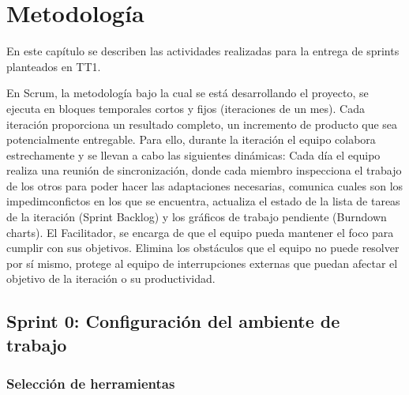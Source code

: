 \chapter{Metodología} \label{cap:siete}

En este capítulo se describen las actividades realizadas para la entrega de sprints planteados en TT1.

En Scrum, la metodología bajo la cual se está desarrollando el proyecto, se ejecuta en bloques temporales cortos y fijos (iteraciones de un mes). Cada iteración proporciona un resultado completo, un incremento de producto que sea potencialmente entregable. Para ello, durante la iteración el equipo colabora estrechamente y se llevan a cabo las siguientes dinámicas:
\bigskip
Cada día el equipo realiza una reunión de sincronización, donde cada miembro inspecciona el trabajo de los otros para poder hacer las adaptaciones necesarias, comunica cuales son los impedimconfictos en los que se encuentra, actualiza el estado de la lista de tareas de la iteración (Sprint Backlog) y los gráficos de trabajo pendiente (Burndown charts).
\bigskip
El Facilitador, se encarga de que el equipo pueda mantener el foco para cumplir con sus objetivos.
Elimina los obstáculos que el equipo no puede resolver por sí mismo, protege al equipo de interrupciones externas que puedan afectar el objetivo de la iteración o su productividad.
\newpage

\section{Sprint 0: Configuración del ambiente de trabajo}
\subsection{Selección de herramientas}


